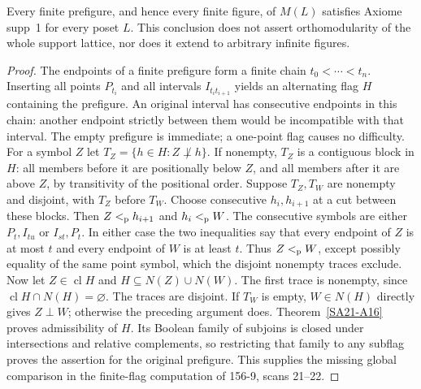 \begin{theorem}
\label{SA21-A09}
Every finite prefigure, and hence every finite figure, of $M(L)$
satisfies Axiome supp~1 for every poset $L$.
This conclusion does not assert orthomodularity of the whole support
lattice, nor does it extend to arbitrary infinite figures.
\end{theorem}
\begin{proof}
The endpoints of a finite prefigure form a finite chain
$t_0<\cdots<t_n$. Inserting all points $P_{t_i}$ and all intervals
$I_{t_it_{i+1}}$ yields an alternating flag $H$ containing the
prefigure. An original interval has consecutive endpoints in this
chain: another endpoint strictly between them would be incompatible
with that interval. The empty prefigure is immediate; a one-point
flag causes no difficulty.
For a symbol $Z$ let
$T_Z=\{h\in H:Z\not\perp h\}$. If nonempty, $T_Z$ is a contiguous
block in $H$: all members before it are positionally below $Z$,
and all members after it are above $Z$, by transitivity of the
positional order. Suppose $T_Z,T_W$ are nonempty and disjoint, with
$T_Z$ before $T_W$. Choose consecutive $h_i,h_{i+1}$ at a cut between
these blocks. Then $Z<_{\rm p}h_{i+1}$ and $h_i<_{\rm p}W$.
The consecutive symbols are either $P_t,I_{tu}$ or $I_{st},P_t$.
In either case the two inequalities say that every endpoint of $Z$
is at most $t$ and every endpoint of $W$ is at least $t$. Thus
$Z<_{\rm p}W$, except possibly equality of the same point symbol,
which the disjoint nonempty traces exclude.
Now let $Z\in\operatorname{cl}H$ and
$H\subseteq N(Z)\cup N(W)$. The first trace is nonempty, since
$\operatorname{cl}H\cap N(H)=\varnothing$. The traces are disjoint.
If $T_W$ is empty, $W\in N(H)$ directly gives $Z\perp W$;
otherwise the preceding argument does. Theorem~\ref{SA21-A16}
proves admissibility of $H$. Its Boolean family of subjoins is closed
under intersections and relative complements, so restricting that
family to any subflag proves the assertion for the original
prefigure. This supplies the missing global comparison in the
finite-flag computation of 156-9, scans 21--22.
\end{proof}

